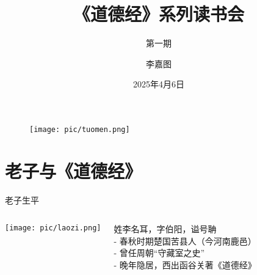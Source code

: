 \documentclass{beamer}
\author{李嘉图\textrm{}}
\title{《道德经》系列读书会\textrm{}} %
\subtitle{第一期\textrm{}}
\institute[陀思妥耶夫斯基读书会]{陀门中哲分部} %
\date{\textrm{2025}年\textrm{4}月\textrm{6}日}
\begin{document}
\kaishu
\begin{frame}
	\titlepage 
	\begin{figure}[htpb]
		\begin{center}
			\texttt{[image: pic/tuomen.png]}
		\end{center}
	\end{figure}
\end{frame}

\begin{frame}
	\tableofcontents
\end{frame}


\section{老子与《道德经》}
\begin{frame}{老子生平}
    \begin{columns}
        \begin{center}  %
            \texttt{[image: pic/laozi.png]}
        \end{center}
            姓李名耳，字伯阳，谥号聃 \\
		\vspace{0.2 cm}
            - 春秋时期楚国苦县人（今河南鹿邑）\\
            - 曾任周朝“守藏室之史” \\
            - 晚年隐居，西出函谷关著《道德经》
    \end{columns}
\end{frame}
\end{document}
